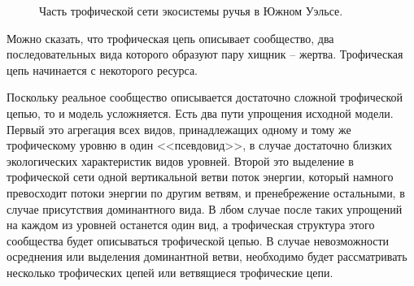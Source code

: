 \begin{figure}[H]
        \caption{Часть трофической сети экосистемы ручья в Южном Уэльсе.} \label{small_river_graph}
    \end{figure}

    Можно сказать, что трофическая цепь описывает сообщество, два последовательных вида которого образуют пару хищник -- жертва. Трофическая цепь начинается с некоторого ресурса.

    Поскольку реальное сообщество описывается достаточно сложной трофической цепью, то и модель усложняется. Есть два пути упрощения исходной модели. Первый это агрегация всех видов, принадлежащих одному и тому же трофическому уровню в один <<псевдовид>>, в случае достаточно близких экологических характеристик видов уровней. Второй это выделение в трофической сети одной вертикальной ветви поток энергии, который намного превосходит потоки энергии по другим ветвям, и пренебрежение остальными, в случае присутствия доминантного вида. В лбом случае после таких упрощений на каждом из уровней останется один вид, а трофическая структура этого сообщества будет описываться трофической цепью. В случае невозможности осреднения или выделения доминантной ветви, необходимо будет рассматривать несколько трофических цепей или ветвящиеся трофические цепи.


